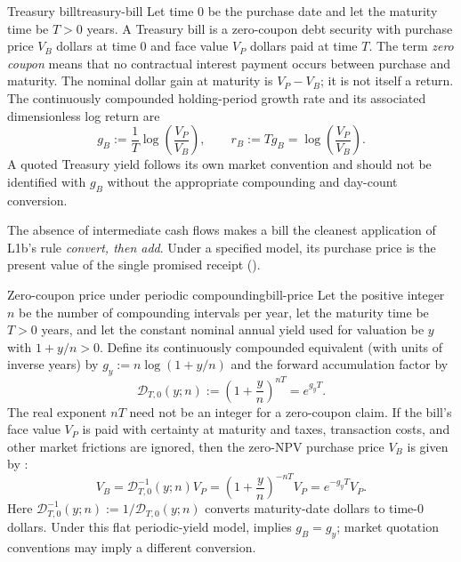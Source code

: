 \documentclass[11pt]{article}
\newcommand{\D}{\mathcal{D}}
\begin{document}
\begin{definition}{Treasury bill}{treasury-bill}
Let time $0$ be the purchase date and let the maturity time be $T>0$ years. A Treasury bill is a zero-coupon debt security with purchase price $V_B$ dollars at time $0$ and face value $V_P$ dollars paid at time $T$. The term \emph{zero coupon} means that no contractual interest payment occurs between purchase and maturity. The nominal dollar gain at maturity is $V_P-V_B$; it is not itself a return. The continuously compounded holding-period growth rate and its associated dimensionless log return are
\begin{equation}
  \label{eq:bill-growth}
  g_B:=\frac{1}{T}\log\!\left(\frac{V_P}{V_B}\right),
  \qquad
  r_B:=Tg_B=\log\!\left(\frac{V_P}{V_B}\right).
\end{equation}
A quoted Treasury yield follows its own market convention and should not be identified with $g_B$ without the appropriate compounding and day-count conversion.
\end{definition}

The absence of intermediate cash flows makes a bill the cleanest application of L1b's rule \emph{convert, then add}. Under a specified model, its purchase price is the present value of the single promised receipt ().

\begin{theorem}{Zero-coupon price under periodic compounding}{bill-price}
Let the positive integer $n$ be the number of compounding intervals per year, let the maturity time be $T>0$ years, and let the constant nominal annual yield used for valuation be $y$ with $1+y/n>0$. Define its continuously compounded equivalent (with units of inverse years) by $g_y:=n\log(1+y/n)$ and the forward accumulation factor by
\begin{equation}
  \label{eq:yield-growth-conversion}
  \D_{T,0}(y;n):=\left(1+\frac{y}{n}\right)^{nT}=e^{g_yT}.
\end{equation}
The real exponent $nT$ need not be an integer for a zero-coupon claim. If the bill's face value $V_P$ is paid with certainty at maturity and taxes, transaction costs, and other market frictions are ignored, then the zero-NPV purchase price $V_B$ is given by :
\begin{equation}
  \label{eq:bill-price}
  V_B=\D_{T,0}^{-1}(y;n)V_P
  =\left(1+\frac{y}{n}\right)^{-nT}V_P
  =e^{-g_yT}V_P.
\end{equation}
Here $\D_{T,0}^{-1}(y;n):=1/\D_{T,0}(y;n)$ converts maturity-date dollars to time-0 dollars. Under this flat periodic-yield model,  implies $g_B=g_y$; market quotation conventions may imply a different conversion.
\end{theorem}
\end{document}
